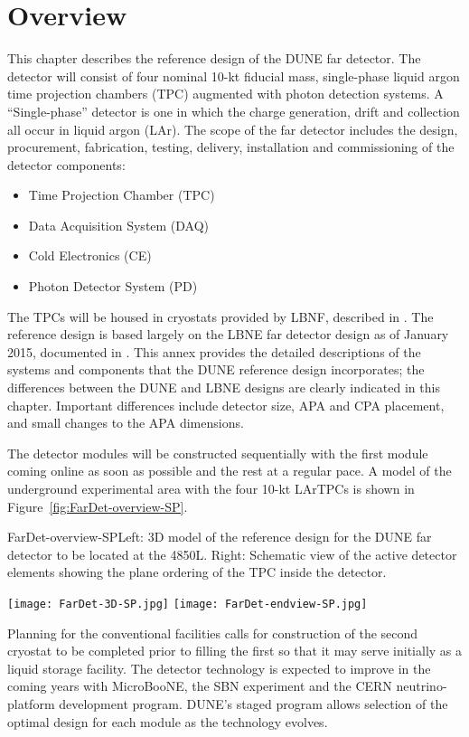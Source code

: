 \section{Overview}
\label{sec:detectors-fd-ref-ov}


This chapter describes the reference design of the DUNE far detector.
The detector will consist of four nominal 10-kt fiducial mass,
single-phase liquid argon time projection chambers (TPC) augmented
with photon detection systems.  A ``Single-phase'' detector is one in
which the charge generation, drift and collection all occur in liquid
argon (LAr). The scope of the far detector includes the design,
procurement, fabrication, testing, delivery, installation and
commissioning of the detector components:
\begin{itemize}
\item Time Projection Chamber (TPC)
\item Data Acquisition System (DAQ)  
\item Cold Electronics (CE)
\item Photon Detector System (PD)
\end{itemize}
The TPCs will be housed in cryostats provided by LBNF, described in
\vollbnf. The reference design is based largely on the LBNE far
detector design as of January 2015, documented in \anxlbnefd. This
annex provides the detailed descriptions of the systems and components
that the DUNE reference design incorporates; the differences between
the DUNE and LBNE designs are clearly indicated in this
chapter. Important differences include detector size, APA and CPA
placement, and small changes to the APA dimensions.


The detector modules will be constructed sequentially
with the first module coming online as soon as possible and the rest
at a regular pace. A model of the underground experimental area with
the four 10-kt LArTPCs is shown in
Figure~\ref{fig:FarDet-overview-SP}. 
\begin{cdrfigure}{FarDet-overview-SP}{Left: 3D model of the reference design for the DUNE far detector to be located at the 4850L. Right: Schematic view of the active detector elements showing the plane ordering of the TPC inside the detector.}
\centering
\begin{minipage}[b]{1.0\textwidth}
\begin{center}
\texttt{[image: FarDet-3D-SP.jpg]}
\texttt{[image: FarDet-endview-SP.jpg]}
\end{center}
\end{minipage}
\end{cdrfigure}
Planning for the conventional facilities calls for construction of the
second cryostat to be completed prior to filling the first so that it
may serve initially as a liquid storage facility.  The detector
technology is expected to improve in the coming years with MicroBooNE,
the SBN experiment and the CERN neutrino-platform development
program. DUNE's staged program allows selection of the optimal design
for each module as the technology evolves.  %


